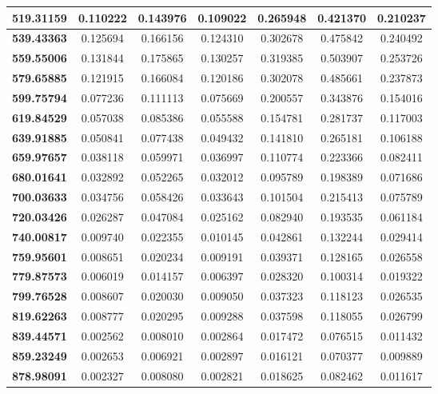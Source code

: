 \documentclass[10pt, a4paper]{article}
\begin{document}
\begin{table}[htbp]
\begin{center}
\begin{tabular}{|c|c|c|c|c|c|c|}
		\textbf{519.31159} & 0.110222 & 0.143976 & 0.109022 & 0.265948 & 0.421370 & 0.210237 \\ \hline
		\textbf{539.43363} & 0.125694 & 0.166156 & 0.124310 & 0.302678 & 0.475842 & 0.240492 \\ \hline
		\textbf{559.55006} & 0.131844 & 0.175865 & 0.130257 & 0.319385 & 0.503907 & 0.253726 \\ \hline
		\textbf{579.65885} & 0.121915 & 0.166084 & 0.120186 & 0.302078 & 0.485661 & 0.237873 \\ \hline
		\textbf{599.75794} & 0.077236 & 0.111113 & 0.075669 & 0.200557 & 0.343876 & 0.154016 \\ \hline
		\textbf{619.84529} & 0.057038 & 0.085386 & 0.055588 & 0.154781 & 0.281737 & 0.117003 \\ \hline
		\textbf{639.91885} & 0.050841 & 0.077438 & 0.049432 & 0.141810 & 0.265181 & 0.106188 \\ \hline
		\textbf{659.97657} & 0.038118 & 0.059971 & 0.036997 & 0.110774 & 0.223366 & 0.082411 \\ \hline
		\textbf{680.01641} & 0.032892 & 0.052265 & 0.032012 & 0.095789 & 0.198389 & 0.071686 \\ \hline
		\textbf{700.03633} & 0.034756 & 0.058426 & 0.033643 & 0.101504 & 0.215413 & 0.075789 \\ \hline
		\textbf{720.03426} & 0.026287 & 0.047084 & 0.025162 & 0.082940 & 0.193535 & 0.061184 \\ \hline
		\textbf{740.00817} & 0.009740 & 0.022355 & 0.010145 & 0.042861 & 0.132244 & 0.029414 \\ \hline
		\textbf{759.95601} & 0.008651 & 0.020234 & 0.009191 & 0.039371 & 0.128165 & 0.026558 \\ \hline
		\textbf{779.87573} & 0.006019 & 0.014157 & 0.006397 & 0.028320 & 0.100314 & 0.019322 \\ \hline
		\textbf{799.76528} & 0.008607 & 0.020030 & 0.009050 & 0.037323 & 0.118123 & 0.026535 \\ \hline
		\textbf{819.62263} & 0.008777 & 0.020295 & 0.009288 & 0.037598 & 0.118055 & 0.026799 \\ \hline
		\textbf{839.44571} & 0.002562 & 0.008010 & 0.002864 & 0.017472 & 0.076515 & 0.011432 \\ \hline
		\textbf{859.23249} & 0.002653 & 0.006921 & 0.002897 & 0.016121 & 0.070377 & 0.009889 \\ \hline
		\textbf{878.98091} & 0.002327 & 0.008080 & 0.002821 & 0.018625 & 0.082462 & 0.011617 \\ \hline

\end{tabular}
\end{center}
\end{table}
\end{document}
